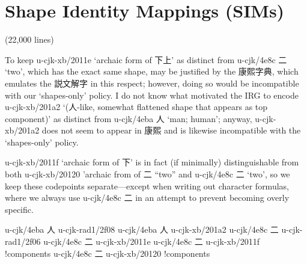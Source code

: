 \section{Shape Identity Mappings (SIMs)
}
\begin{multicols}{2}(22,000 lines)\mktsShowpar\par
To keep u-cjk-xb/2011e { }‘archaic form of {\cjk{}下上}’ as distinct from
u-cjk/4e8c {\cjk{}二} ‘two’, which has the
exact same shape, may be justified by the {\cjk{}康熙字典}, which
emulates the {\cjk{}説文解字} in this respect; however, doing
so would be incompatible with our ‘shapes-only’ policy. I do not know
what motivated the IRG to encode u-cjk-xb/201a2 { }‘({\cjk{}人}-like, somewhat
flattened shape that appears as top component)’ as distinct from u-cjk/4eba {\cjk{}人}
‘man; human’; anyway, u-cjk-xb/201a2 { }does not seem to appear in {\cjk{}康熙} and
is likewise incompatible with the ‘shapes-only’ policy.\mktsShowpar\par
u-cjk-xb/2011f { }‘archaic form of {\cjk{}下}’ is in fact (if minimally)
distinguishable from both u-cjk-xb/20120 { }'archaic from of {\cjk{}二} “two”
and u-cjk/4e8c {\cjk{}二} ‘two’, so we keep these codepoints separate—except
when writing out character formulas, where we always use u-cjk/4e8c {\cjk{}二}
in an attempt to prevent becoming overly specific.\mktsShowpar\par
\begingroup\mktsObeyAllLines{}

\begingroup\mktsStyleCode{}u-cjk/4eba	{\cjk{}人}	u-cjk-rad1/2f08	{} 
u-cjk/4eba	{\cjk{}人}	u-cjk-xb/201a2	{} 
u-cjk/4e8c	{\cjk{}二}	u-cjk-rad1/2f06	{} 
u-cjk/4e8c	{\cjk{}二}	u-cjk-xb/2011e	{} 
u-cjk/4e8c	{\cjk{}二}	u-cjk-xb/2011f	{}!components 
u-cjk/4e8c	{\cjk{}二}	u-cjk-xb/20120	{}!components 
\endgroup{}{}


\end{multicols}
